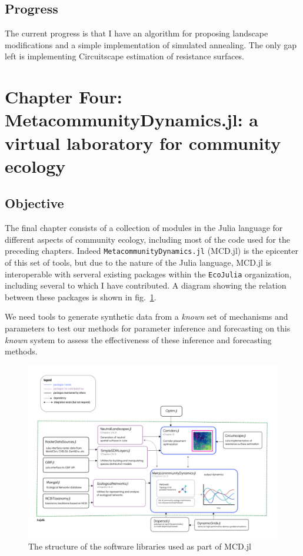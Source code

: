 \documentclass[10pt,oneside]{article}
\makeatletter
\def\maxwidth{\ifdim\Gin@nat@width>\linewidth\linewidth
\else\Gin@nat@width\fi}
\let\Oldincludegraphics\includegraphics
\renewcommand{\includegraphics}[1]{\Oldincludegraphics[width=\maxwidth]{#1}}
\makeatother
\begin{document}
\hypertarget{progress-2}{%
\subsection{Progress}\label{progress-2}}

The current progress is that I have an algorithm for proposing landscape
modifications and a simple implementation of simulated annealing. The
only gap left is implementing Circuitscape estimation of resistance
surfaces.

\hypertarget{chapter-four-metacommunitydynamics.jl-a-virtual-laboratory-for-community-ecology}{%
\section{Chapter Four: MetacommunityDynamics.jl: a virtual laboratory
for community
ecology}\label{chapter-four-metacommunitydynamics.jl-a-virtual-laboratory-for-community-ecology}}

\hypertarget{objective-2}{%
\subsection{Objective}\label{objective-2}}

The final chapter consists of a collection of modules in the Julia
language for different aspects of community ecology, including most of
the code used for the preceding chapters. Indeed
\texttt{MetacommunityDynamics.jl} (MCD.jl) is the epicenter of this set
of tools, but due to the nature of the Julia language, MCD.jl is
interoperable with serveral existing packages within the
\texttt{EcoJulia} organization, including several to which I have
contributed. A diagram showing the relation between these packages is
shown in fig.~\ref{fig:software}.

We need tools to generate synthetic data from a \emph{known} set of
mechanisms and parameters to test our methods for parameter inference
and forecasting on this \emph{known} system to assess the effectiveness
of these inference and forecasting methods.

\begin{figure}
\hypertarget{fig:software}{%
\centering
\includegraphics{./figures/ch4.png}
\caption{The structure of the software libraries used as part of
MCD.jl}\label{fig:software}
}
\end{figure}
\end{document}
